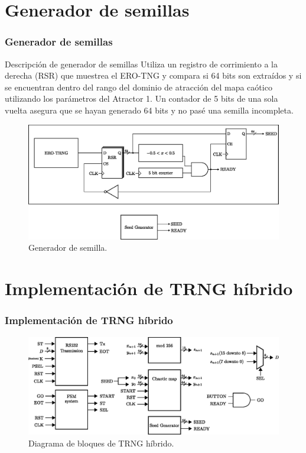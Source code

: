 \documentclass[10pt]{beamer}
\begin{document}
\section{Generador de semillas}

\begin{frame}
    \frametitle{Generador de semillas}
    \begin{block}{Descripción de generador de semillas}
        \justifying
        Utiliza un registro de corrimiento a la derecha (RSR) que muestrea el ERO-TNG y compara si 64 bits son extraídos y si se encuentran dentro del rango del dominio de atracción del mapa caótico utilizando los parámetros del Atractor 1. Un contador de 5 bits de una sola vuelta asegura que se hayan generado 64 bits y no pasé una semilla incompleta.
	\end{block}
        \begin{figure}[hbtp]
            \centering
            \includegraphics[width=0.8\linewidth]{J2_trng}
            \caption{Generador de semilla.}
            \label{fig:J2_trng}
        \end{figure}
\end{frame}

\section{Implementación de TRNG híbrido}

\begin{frame}
    \frametitle{Implementación de TRNG híbrido}
        \begin{figure}[hbtp]
            \centering
            \includegraphics[width=0.99\linewidth]{D0_system}
            \caption{Diagrama de bloques de TRNG híbrido.}
            \label{fig:D0_system}
        \end{figure}
\end{frame}
\end{document}
